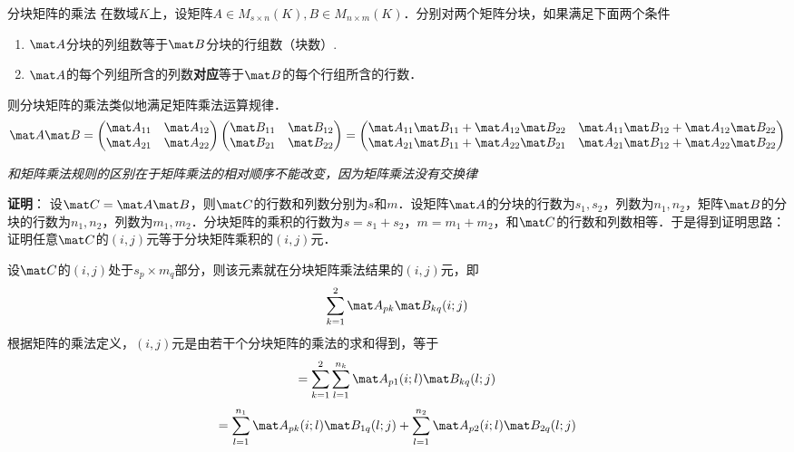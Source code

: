 \begin{theorem}{分块矩阵的乘法}
在数域$K$上，设矩阵$A\in{M_{s\times{n}}(K)},B\in{M_{n\times{m}}(K)}$．分别对两个矩阵分块，如果满足下面两个条件
\begin{enumerate}
\item $\mat A$分块的列组数等于$\mat B$分块的行组数（块数）.
\item $\mat A$的每个列组所含的列数\textbf{对应}等于$\mat B$的每个行组所含的行数．
\end{enumerate}
则分块矩阵的乘法类似地满足矩阵乘法运算规律．
\begin{equation}
\mat A\mat B=
\begin{pmatrix}
\mat A_{11} & \mat A_{12}\\
\mat A_{21} & \mat A_{22}
\end{pmatrix}
\begin{pmatrix}
\mat B_{11} & \mat B_{12}\\
\mat B_{21} & \mat B_{22}
\end{pmatrix}
=
\begin{pmatrix}
\mat A_{11}\mat B_{11}+\mat A_{12}\mat B_{22} & \mat A_{11}\mat B_{12}+\mat A_{12}\mat B_{22}\\
\mat A_{21}\mat B_{11}+\mat A_{22}\mat B_{21} & \mat A_{21}\mat B_{12}+\mat A_{22}\mat B_{22}
\end{pmatrix}
\end{equation}
\end{theorem}
\textsl{和矩阵乘法规则的区别在于矩阵乘法的相对顺序不能改变，因为矩阵乘法没有交换律}

\textbf{证明}：
设$\mat C=\mat A\mat B$，则$\mat C$的行数和列数分别为$s$和$m$．设矩阵$\mat A$的分块的行数为$s_1,s_2$，列数为$n_1,n_2$，矩阵$\mat B$的分块的行数为$n_1,n_2$，列数为$m_1,m_2$．分块矩阵的乘积的行数为$s=s_1+s_2$，$m=m_1+m_2$，和$\mat C$的行数和列数相等．于是得到证明思路：证明任意$\mat C$的$(i,j)$元等于分块矩阵乘积的$(i,j)$元．

设$\mat C$的$(i,j)$处于$s_p\times{m_q}$部分，则该元素就在分块矩阵乘法结果的$(i,j)$元，即
\[\sum_{k=1}^{2}\mat A_{pk}\mat B_{kq}(i;j)\]
根据矩阵的乘法定义，$(i,j)$元是由若干个分块矩阵的乘法的求和得到，等于
\[=\sum_{k=1}^{2}\sum_{l=1}^{n_k}\mat A_{p1}(i;l)\mat B_{kq}(l;j)\]
\[=\sum_{l=1}^{n_1}\mat A_{pk}(i;l)\mat B_{1q}(l;j)+\sum_{l=1}^{n_2}\mat A_{p2}(i;l)\mat B_{2q}(l;j)\]


